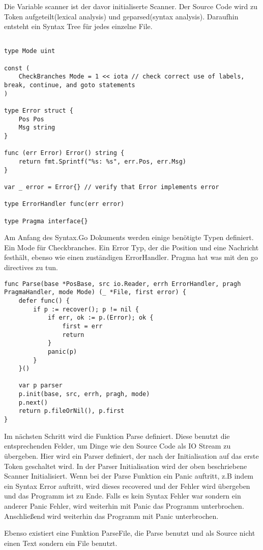 Die Variable scanner ist der davor initialiserte Scanner.
Der Source Code wird zu Token aufgeteilt(lexical analysis) und geparsed(syntax analysis). Daraufhin entsteht ein Syntax Tree für jedes einzelne File.  
\begin{lstlisting}

type Mode uint

const (
	CheckBranches Mode = 1 << iota // check correct use of labels, break, continue, and goto statements
)

type Error struct {
	Pos Pos
	Msg string
}

func (err Error) Error() string {
	return fmt.Sprintf("%s: %s", err.Pos, err.Msg)
}

var _ error = Error{} // verify that Error implements error

type ErrorHandler func(err error)

type Pragma interface{}
\end{lstlisting}
Am Anfang des Syntax.Go Dokuments werden einige benötigte Typen definiert. Ein Mode für Checkbranches. Ein Error Typ, der die Position und eine Nachricht festhält, ebenso wie einen zuständigen ErrorHandler. Pragma hat was mit den go directives zu tun.
\begin{lstlisting}
func Parse(base *PosBase, src io.Reader, errh ErrorHandler, pragh PragmaHandler, mode Mode) (_ *File, first error) {
	defer func() {
		if p := recover(); p != nil {
			if err, ok := p.(Error); ok {
				first = err
				return
			}
			panic(p)
		}
	}()

	var p parser
	p.init(base, src, errh, pragh, mode)
	p.next()
	return p.fileOrNil(), p.first
}
\end{lstlisting}
Im nächsten Schritt wird die Funktion Parse definiert. Diese benutzt die entsprechenden Felder, um Dinge wie den Source Code als IO Stream zu übergeben. Hier wird ein Parser definiert, der nach der Initialisation auf das erste Token geschaltet wird. In der Parser Initialisation wird der oben beschriebene Scanner Initialisiert. Wenn bei der Parse Funktion ein Panic auftritt, z.B indem ein Syntax Error auftritt, wird dieses recovered und der Fehler wird übergeben und das Programm ist zu Ende. Falls es kein Syntax Fehler war sondern ein anderer Panic Fehler, wird weiterhin mit Panic das Programm unterbrochen. Anschließend wird weiterhin das Programm mit Panic unterbrochen.

Ebenso existiert eine Funktion ParseFile, die Parse benutzt und als Source nicht einen Text sondern ein File benutzt.

